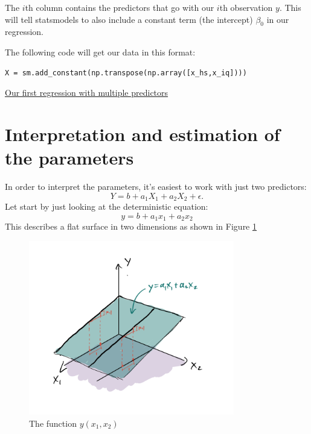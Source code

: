 The $i$th column contains the predictors that go with our $i$th observation $y$. This will tell statsmodels to also include a constant term (the intercept) $\beta_0$ in our regression. 

The following code will get our data in this format:
\begin{Verbatim}
X = sm.add_constant(np.transpose(np.array([x_hs,x_iq])))
\end{Verbatim}

\begin{example}
\href{https://colab.research.google.com/drive/1oIRgP_7-c5DGV1D2iz5nj406mZfJxUIG#scrollTo=wbeO1TS8os5J&line=15&uniqifier=1}{Our first regression with multiple predictors}
\end{example}


\section{Interpretation and estimation of the parameters }

In order to interpret the parameters, it's easiest to work with just two predictors:
\begin{equation}
Y = b + a_1X_1 + a_2X_2 + \epsilon.  
\end{equation}
Let start by just looking at the deterministic equation:  
\begin{equation}
y = b + a_1x_1 + a_2x_2
\end{equation}
This describes a flat surface in two dimensions as shown in Figure \ref{fig:plane}

\begin{figure}[h]
    \centering
    \includegraphics[width=0.8\textwidth]{plane}
    \caption{The function $y(x_1,x_2)$}
    \label{fig:plane}
\end{figure}


